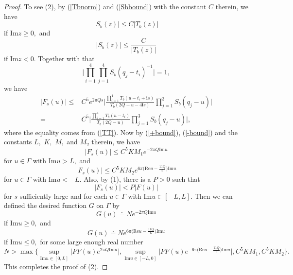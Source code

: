 \documentclass[11pt]{article}
\theoremstyle{remark}
\theoremstyle{remark}
\numberwithin{equation}{section}
\begin{document}
\begin{proof}
To see (2), by (\ref{Tbnorm}) and (\ref{Sbbound}) with the constant $C$ therein, we have
\begin{equation}\label{STC}
    |S_b(z)|\leqslant C |T_b(z)|
\end{equation}
if $\mathrm{Im}z\geqslant 0,$
and 
$$|S_b(z)|\leqslant \frac{C}{ |T_b(z)|}$$
if $\mathrm{Im}z < 0.$ Together with \cite[Formula (2.20)]{LMSWY} that 
\begin{equation}\label{=1}
    \bigg|\prod_{i=1}^4\prod_{j=1}^4S_b(q_j-t_i)^{-1}\bigg|=1,
\end{equation}
 we have
\begin{equation*}
\begin{split}
|F_s(u)|\leqslant & C^5 e^{2\pi Qs}  \Bigg|\frac{\prod_{i=1}^4 T_b(u-t_i+\mathbf is)}{T_b(2Q-u-4\mathbf is)}\prod_{j=1}^3 S_b(q_j-u)\Bigg|\\
= &  C^5  \Bigg|\frac{\prod_{i=1}^4 T_b(u-t_i)}{T_b(2Q-u)}\prod_{j=1}^3 S_b(q_j-u)\Bigg|,
\end{split}    
\end{equation*}
where the equality comes from (\ref{TT}). Now by (\ref{+bound}), (\ref{-bound}) and the constants $L,$ $K,$ $M_1$ and $M_2$ therein, we have 
$$|F_s(u)| \leqslant C^5KM_1 e^{-2\pi Q\mathrm{Im}u}$$
for $u\in \Gamma$ with $\mathrm{Im}u>L,$ and 
$$|F_s(u)| \leqslant C^5KM_2 e^{6\pi \big(\mathrm{Re}u-\frac{11Q}{6}\big)\mathrm{Im}u}$$
for $u\in \Gamma$ with $\mathrm{Im}u<-L.$
Also, by (1), there is a $P>0$ such that 
$$|F_s(u)|<P|F(u)|$$
for $s$ sufficiently large and for each $u\in\Gamma$ with $\mathrm{Im}u \in [-L, L].$ Then we can defined the desired function $G$ on $\Gamma$ by 
$$G(u) \doteq  Ne^{-2\pi Q\mathrm{Im}u}$$
if  $\mathrm{Im}u\geqslant 0,$ and 
$$G(u) \doteq  Ne^{6\pi \big(\mathrm{Re}u-\frac{11Q}{6}\big)\mathrm{Im}u}$$
if $\mathrm{Im}u\leqslant 0,$
for some large enough real number 
$$N>\max \bigg\{\sup _{\mathrm{Im}u\in [0,L]}\Big|PF(u)e^{2\pi Q\mathrm{Im}u}\Big|,\sup _{\mathrm{Im}u\in [-L,0]}\Big|PF(u)e^{-6\pi \big(\mathrm{Re}u-\frac{11Q}{6}\big)\mathrm{Im}u}\Big|, C^5KM_1, C^5KM_2 \bigg\}.$$
This completes the proof of (2).
\end{proof}
\end{document}
